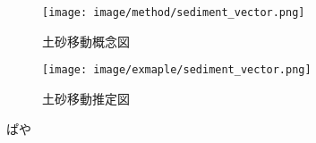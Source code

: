     \begin{figure}[tbp]
      \centering
      \texttt{[image: image/method/sediment\_vector.png]}
      \caption{土砂移動概念図}
      \label{土砂移動概念図}
    \end{figure}

    \begin{figure}[tbp]
      \centering
      \texttt{[image: image/exmaple/sediment\_vector.png]}
      \caption{土砂移動推定図}
      \label{土砂移動推定結果}
    \end{figure}
    ぱや
  
